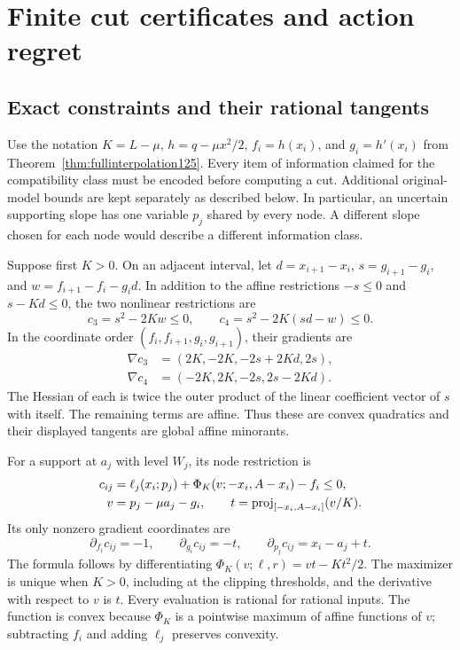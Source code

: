 \section{Finite cut certificates and action regret}
\label{supp:computed126}

\subsection{Exact constraints and their rational tangents}

Use the notation $K=L-\mu$,
$h=q-\mu x^2/2$, $f_i=h(x_i)$, and $g_i=h'(x_i)$ from
Theorem~\ref{thm:fullinterpolation125}. Every item of information
claimed for the compatibility class must be encoded before computing a
cut. Additional original-model bounds are kept separately as described
below. In particular, an uncertain
supporting slope has one variable $p_j$ shared by every node. A
different slope chosen for each node would describe a different
information class.

Suppose first $K>0$. On an adjacent interval, let
$d=x_{i+1}-x_i$, $s=g_{i+1}-g_i$, and
$w=f_{i+1}-f_i-g_id$. In addition to the affine restrictions
$-s\le0$ and $s-Kd\le0$, the two nonlinear restrictions are
\[
 c_3=s^2-2Kw\le0,\qquad
 c_4=s^2-2K(sd-w)\le0.
\]
In the coordinate order $(f_i,f_{i+1},g_i,g_{i+1})$, their gradients are
\begin{align*}
 \nabla c_3&=(2K,-2K,-2s+2Kd,2s),\\
 \nabla c_4&=(-2K,2K,-2s,2s-2Kd).
\end{align*}
The Hessian of each is twice the outer product of the linear
coefficient vector of $s$ with itself. The remaining terms are affine.
Thus these are convex quadratics and their displayed tangents are
global affine minorants.

For a support at $a_j$ with level $W_j$, its node restriction is
\begin{align*}
 c_{ij}
 &=\ell_j(x_i;p_j)+\Phi_K(v;-x_i,A-x_i)-f_i\le0,\\
 v&=p_j-\mu a_j-g_i,\qquad
 t={\rm proj}_{[-x_i,A-x_i]}(v/K).
\end{align*}
Its only nonzero gradient coordinates are
\[
 \partial_{f_i}c_{ij}=-1,\qquad
 \partial_{g_i}c_{ij}=-t,\qquad
 \partial_{p_j}c_{ij}=x_i-a_j+t.
\]
The formula follows by differentiating
$\Phi_K(v;\ell,r)=vt-Kt^2/2$. The maximizer is unique when
$K>0$, including at the clipping thresholds, and the derivative with
respect to $v$ is $t$. Every evaluation is rational for rational
inputs. The function is convex because $\Phi_K$ is a pointwise
maximum of affine functions of $v$; subtracting $f_i$ and adding
$\ell_j$ preserves convexity.

